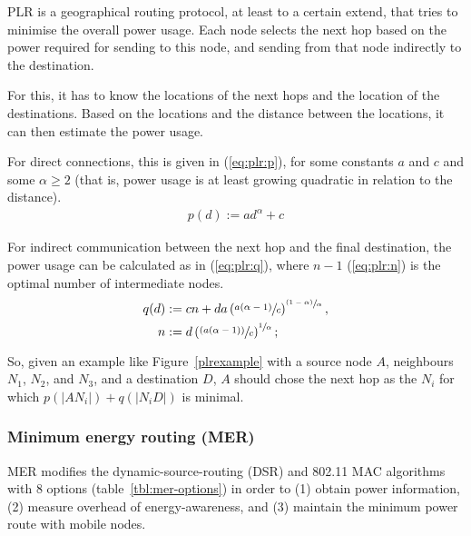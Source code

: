 PLR\cite{stojmenovic2001power} is a geographical routing protocol, at least
to a certain extend, that tries to minimise the overall power usage. Each node
selects the next hop based on the power required for sending to this node, and
sending from that node indirectly to the destination.

For this, it has to know the locations of the next hops and the location of
the destinations. Based on the locations and the distance between the locations,
it can then estimate the power usage.

For direct connections, this is given in (\ref{eq:plr:p}),
for some constants $a$ and $c$ and some $\alpha \ge 2$ (that is, power usage
is at least growing quadratic in relation to the distance).
\begin{align}\label{eq:plr:p} p(d) := ad^{\alpha} + c \end{align}

For indirect communication between the next hop and the final destination,
the power usage can be calculated as in (\ref{eq:plr:q}), where $n-1$ (\ref{eq:plr:n}) is the optimal number of intermediate nodes\cite{stojmenovic2001power}.
\begin{align}
  \label{eq:plr:q}
   q(d) &:= cn + da \left(\sfrac{a(\alpha - 1)}{c}\right)^{\sfrac{(1-\alpha)}{\alpha}}, \\
   \label{eq:plr:n}
      n &:= d\left(\sfrac{(a(\alpha - 1))}{c}\right)^{\sfrac{1}{\alpha}};
\end{align}

So, given an example like Figure~\ref{plrexample} with a source node $A$, neighbours $N_{1}$, $N_{2}$, and $N_{3}$, and a
destination $D$, $A$ should chose the next hop as the $N_{i}$ for which
$p(|AN_{i}|) + q(|N_{i}D|)$ is minimal.

\subsubsection{Minimum energy routing (MER)}
MER\cite{doshi2002demand} modifies the dynamic-source-routing (DSR)\cite{johnson1996dynamic}
and 802.11 MAC algorithms\cite{woesner1998power} with 8 options (table~\ref{tbl:mer-options}) in order to
(1) obtain power information, (2) measure overhead of energy-awareness, and
(3) maintain the minimum power route with mobile nodes.

